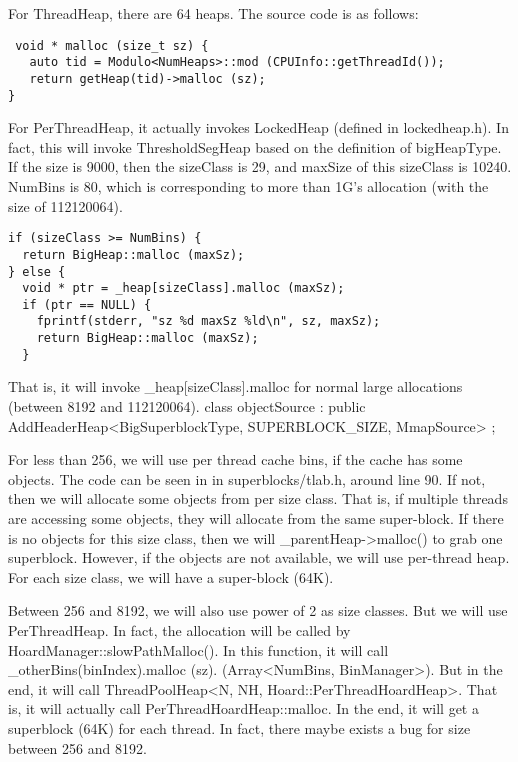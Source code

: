 For ThreadHeap, there are 64 heaps. The source code is as follows:

\begin{lstlisting}
 void * malloc (size_t sz) {
   auto tid = Modulo<NumHeaps>::mod (CPUInfo::getThreadId());
   return getHeap(tid)->malloc (sz);
}	
\end{lstlisting}

For PerThreadHeap, it actually invokes LockedHeap (defined in lockedheap.h). In fact, this will invoke ThresholdSegHeap based on the definition of bigHeapType.  If the size is 9000, then the sizeClass is 29, and maxSize of this sizeClass is 10240. NumBins is 80, which is corresponding to more than 1G's allocation (with the size of 112120064). 
\begin{lstlisting}
if (sizeClass >= NumBins) {
  return BigHeap::malloc (maxSz);
} else {
  void * ptr = _heap[sizeClass].malloc (maxSz);
  if (ptr == NULL) {
    fprintf(stderr, "sz %d maxSz %ld\n", sz, maxSz);
    return BigHeap::malloc (maxSz);
  }	
\end{lstlisting}

 That is, it will invoke \_heap[sizeClass].malloc for normal large allocations (between 8192 and 112120064). 
class objectSource : public AddHeaderHeap<BigSuperblockType,
              SUPERBLOCK\_SIZE,
              MmapSource> {};





For less than 256, we will use per thread cache bins, if the cache has some objects. The code can be seen in in superblocks/tlab.h, around line 90. If not, then we will allocate some objects from per size class. That is, if multiple threads are accessing some objects, they will allocate from the same super-block.  If there is no objects for this size class, then we will \_parentHeap->malloc() to grab one superblock. However, if the objects are not available, we will use per-thread heap. For each size class, we will have a super-block (64K). 

Between 256 and 8192, we will also use power of 2 as size classes. But we will use PerThreadHeap. In fact, the allocation will be called by HoardManager::slowPathMalloc(). In this function, it will call \_otherBins(binIndex).malloc (sz). (Array<NumBins, BinManager>). But in the end, it will call ThreadPoolHeap<N, NH, Hoard::PerThreadHoardHeap>. That is, it will actually call PerThreadHoardHeap::malloc. In the end, it will get a superblock (64K) for each thread.  In fact, there maybe exists a bug for size between 256 and 8192. 

